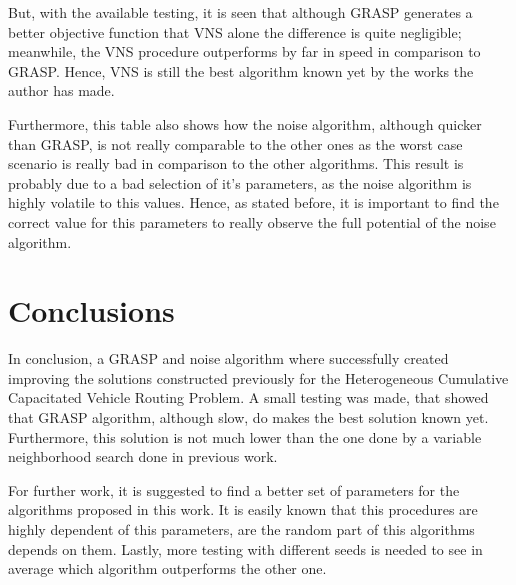 \documentclass[10pt,twoside]{article}
\begin{document}
But, with the available testing, it is seen that although GRASP generates a better objective function that VNS alone the difference is quite negligible; meanwhile, the VNS procedure outperforms by far in speed in comparison to GRASP. Hence, VNS is still the best algorithm known yet by the works the author has made.

Furthermore, this table also shows how the noise algorithm, although
quicker than GRASP, is not really comparable to the other ones as the
worst case scenario is really bad in comparison to the other
algorithms. This result is probably due to a bad selection of it's
parameters, as the noise algorithm is highly volatile to this
values. Hence, as stated before, it is important to find the correct
value for this parameters to really observe the full potential of the
noise algorithm.

\section{Conclusions}\label{sec_conclusions}
In conclusion, a GRASP and noise algorithm where successfully created
improving the solutions constructed previously for the Heterogeneous
Cumulative Capacitated Vehicle Routing Problem. A small testing was
made, that showed that GRASP algorithm, although slow, do makes the
best solution known yet. Furthermore, this solution is not much lower
than the one done by a variable neighborhood search done in previous
work.

For further work, it is suggested to find a better set of parameters
for the algorithms proposed in this work. It is easily known that
this procedures are highly dependent of this parameters, are the
random part of this algorithms depends on them. Lastly, more testing
with different seeds is needed to see in average which algorithm
outperforms the other one.

{\small


}
\end{document}

